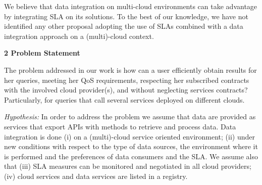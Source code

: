 \documentclass[11pt,a4paper,oneside]{report}
\begin{document}
%
%

We believe that data integration on multi-cloud environments can take advantage by integrating SLA on its solutions. To the best of our knowledge, we have not identified any other proposal adopting the use of SLAs combined with a data integration approach on a (multi)-cloud context.

\begin{flushleft}
\textbf{2 Problem Statement}\\
\end{flushleft}
The problem addressed in our work is how can a user efficiently obtain results for her queries, meeting her QoS requirements, respecting her subscribed contracts with the involved cloud provider(s), and without neglecting services contracts? 
Particularly, for queries that call several services deployed on different clouds.

\noindent
{\em Hypothesis:} In order to address the problem we assume that data are provided as services that export APIs with methods to retrieve  and process data. Data integration is done (i) on a (multi)-cloud service oriented environment;  (ii) under new conditions with respect to the type of data sources, the environment where it is performed and the preferences  of data consumers and the SLA. We assume also that (iii) SLA measures can be monitored and negotiated in all cloud providers; (iv) cloud services and data services are listed in a registry.

\end{document}
